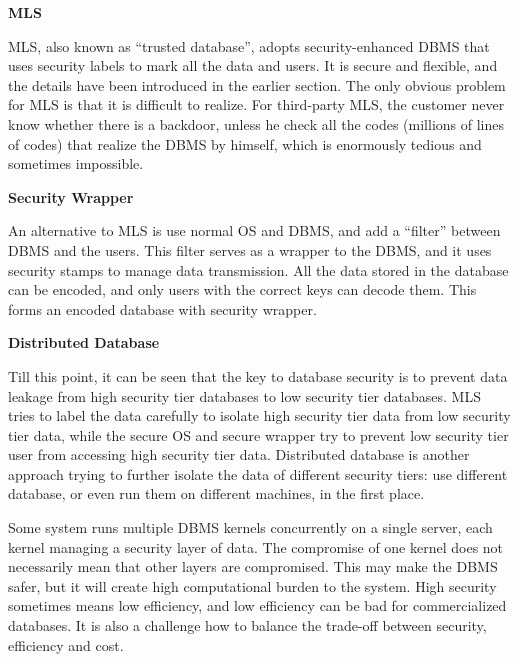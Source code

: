 \vspace{0.1in}
\noindent \textbf{MLS}
\vspace{0.1in}

MLS, also known as ``trusted database'', adopts security-enhanced DBMS that uses security labels to mark all the data and users. It is secure and flexible, and the details have been introduced in the earlier section. The only obvious problem for MLS is that it is difficult to realize. For third-party MLS, the customer never know whether there is a backdoor, unless he check all the codes (millions of lines of codes) that realize the DBMS by himself, which is enormously tedious and sometimes impossible.

\vspace{0.1in}
\noindent \textbf{Security Wrapper}
\vspace{0.1in}

An alternative to MLS is use normal OS and DBMS, and add a ``filter'' between DBMS and the users. This filter serves as a wrapper to the DBMS, and it uses security stamps to manage data transmission. All the data stored in the database can be encoded, and only users with the correct keys can decode them. This forms an encoded database with security wrapper.

\vspace{0.1in}
\noindent \textbf{Distributed Database}
\vspace{0.1in}

Till this point, it can be seen that the key to database security is to prevent data leakage from high security tier databases to low security tier databases. MLS tries to label the data carefully to isolate high security tier data from low security tier data, while the secure OS and secure wrapper try to prevent low security tier user from accessing high security tier data. Distributed database is another approach trying to further isolate the data of different security tiers: use different database, or even run them on different machines, in the first place.

Some system runs multiple DBMS kernels concurrently on a single server, each kernel managing a security layer of data. The compromise of one kernel does not necessarily mean that other layers are compromised. This may make the DBMS safer, but it will create high computational burden to the system. High security sometimes means low efficiency, and low efficiency can be bad for commercialized databases. It is also a challenge how to balance the trade-off between security, efficiency and cost.

